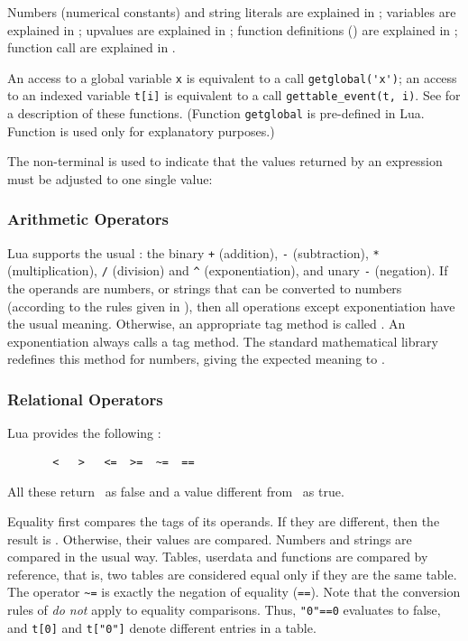 Numbers (numerical constants) and
string literals are explained in ;
variables are explained in ;
upvalues are explained in ;
function definitions () are explained in ;
function call are explained in .

An access to a global variable \verb|x| is equivalent to a
call \verb|getglobal('x')|;
an access to an indexed variable \verb|t[i]| is equivalent to
a call \verb|gettable_event(t, i)|.
See  for a description of these functions.
(Function \verb|getglobal| is pre-defined in Lua.
Function  is used only for explanatory purposes.)

The non-terminal  is used to indicate that the values
returned by an expression must be adjusted to one single value:
\begin{Produc}
\end{Produc}

\subsubsection{Arithmetic Operators}
Lua supports the usual :
the binary \verb|+| (addition),
\verb|-| (subtraction), \verb|*| (multiplication),
\verb|/| (division) and \verb|^| (exponentiation),
and unary \verb|-| (negation).
If the operands are numbers, or strings that can be converted to
numbers (according to the rules given in ),
then all operations except exponentiation have the usual meaning.
Otherwise, an appropriate tag method is called .
An exponentiation always calls a tag method.
The standard mathematical library redefines this method for numbers,
giving the expected meaning to 
.

\subsubsection{Relational Operators}
Lua provides the following :
\begin{verbatim}
       <   >   <=  >=  ~=  ==
\end{verbatim}
All these return \nil\ as false and a value different from \nil\ as true.

Equality first compares the tags of its operands.
If they are different, then the result is \nil.
Otherwise, their values are compared.
Numbers and strings are compared in the usual way.
Tables, userdata and functions are compared by reference,
that is, two tables are considered equal only if they are the same table.
The operator \verb|~=| is exactly the negation of equality (\verb|==|).
Note that the conversion rules of 
\emph{do not} apply to equality comparisons.
Thus, \verb|"0"==0| evaluates to false,
and \verb|t[0]| and \verb|t["0"]| denote different
entries in a table.


